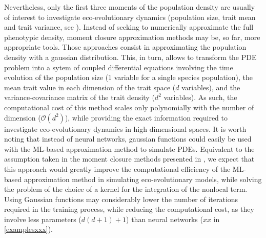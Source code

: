% 
Nevertheless, only the first three moments of the population density are usually of interest to investigate eco-evolutionary dynamics (population size, trait mean and trait variance, see \cite{XXX}). 
% 
Instead of seeking to numerically approximate the full phenotypic density, moment closure approximation methods \citep{Wickman2021,Lion2022,Nordbotten2020} may be, so far, more appropriate tools. Those approaches consist in approximating the population density with a gaussian distribution. This, in turn, allows to transform the PDE problem into a sytem of coupled differential equations involving the time evolution of the population size (1 variable for a single species population), the mean trait value in each dimension of the trait space ($d$ variables), and the variance-covariance matrix of the trait density ($d^2$ variables). As such, the computational cost of this method scales only polynomially with the number of dimension ($\mathcal{O}(d^2)$), while providing the exact information required to investigate eco-evolutionary dynamics in high dimensional spaces. 
% 
It is worth noting that instead of neural networks, gaussian functions could easily be used with the ML-based approximation method to simulate PDEs. Equivalent to the assumption taken in the moment closure methods presented in \cite{Wickman2021,Lion2022,Nordbotten2020}, we expect that this approach would greatly improve the computational efficiency of the ML-based approximation method in simulating eco-evolutionary models, while solving the problem of the choice of a kernel for the integration of the nonlocal term. Using Gaussian functions may considerably lower the number of iterations required in the training process, while reducing the computational cost, as they involve less parameters ($d(d+1) + 1$) than neural networks ($xx$ in \cref{examplesxxx}).



